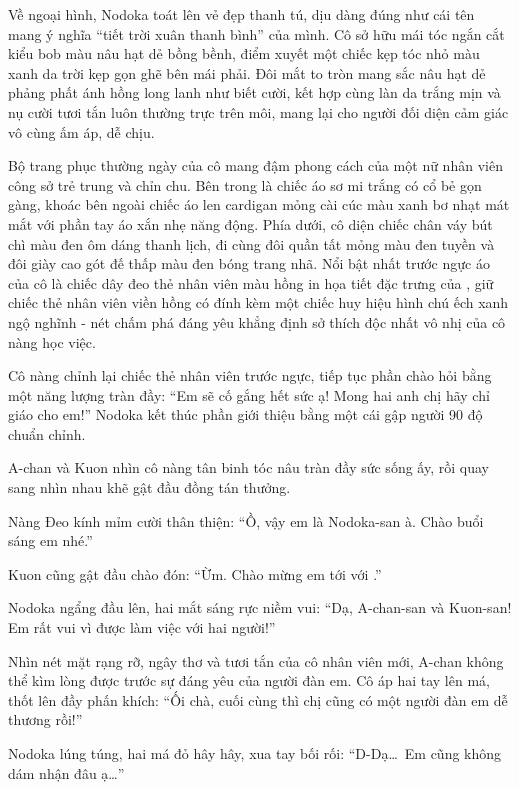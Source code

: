 \documentclass[../main.tex]{subfiles}
\begin{document}
Về ngoại hình, Nodoka toát lên vẻ đẹp thanh tú, dịu dàng đúng như cái tên mang ý nghĩa ``tiết trời xuân thanh bình'' của mình. Cô sở hữu mái tóc ngắn cắt kiểu bob màu nâu hạt dẻ bồng bềnh, điểm xuyết một chiếc kẹp tóc nhỏ màu xanh da trời kẹp gọn ghẽ bên mái phải. Đôi mắt to tròn mang sắc nâu hạt dẻ phảng phất ánh hồng long lanh như biết cười, kết hợp cùng làn da trắng mịn và nụ cười tươi tắn luôn thường trực trên môi, mang lại cho người đối diện cảm giác vô cùng ấm áp, dễ chịu.

Bộ trang phục thường ngày của cô mang đậm phong cách của một nữ nhân viên công sở trẻ trung và chỉn chu. Bên trong là chiếc áo sơ mi trắng có cổ bẻ gọn gàng, khoác bên ngoài chiếc áo len cardigan mỏng cài cúc màu xanh bơ nhạt mát mắt với phần tay áo xắn nhẹ năng động. Phía dưới, cô diện chiếc chân váy bút chì màu đen ôm dáng thanh lịch, đi cùng đôi quần tất mỏng màu đen tuyền và đôi giày cao gót đế thấp màu đen bóng trang nhã. Nổi bật nhất trước ngực áo của cô là chiếc dây đeo thẻ nhân viên màu hồng in họa tiết đặc trưng của \hll, giữ chiếc thẻ nhân viên viền hồng có đính kèm một chiếc huy hiệu hình chú ếch xanh ngộ nghĩnh - nét chấm phá đáng yêu khẳng định sở thích độc nhất vô nhị của cô nàng học việc.

\chrint

Cô nàng chỉnh lại chiếc thẻ nhân viên trước ngực, tiếp tục phần chào hỏi bằng một năng lượng tràn đầy: ``Em sẽ cố gắng hết sức ạ! Mong hai anh chị hãy chỉ giáo cho em!'' Nodoka kết thúc phần giới thiệu bằng một cái gập người 90 độ chuẩn chỉnh.

A-chan và Kuon nhìn cô nàng tân binh tóc nâu tràn đầy sức sống ấy, rồi quay sang nhìn nhau khẽ gật đầu đồng tán thưởng.

Nàng Đeo kính mỉm cười thân thiện: ``Ồ, vậy em là Nodoka-san à. Chào buổi sáng em nhé.''

Kuon cũng gật đầu chào đón: ``Ừm. Chào mừng em tới với \hll.''

Nodoka ngẩng đầu lên, hai mắt sáng rực niềm vui: ``Dạ, A-chan-san và Kuon-san! Em rất vui vì được làm việc với hai người!''

Nhìn nét mặt rạng rỡ, ngây thơ và tươi tắn của cô nhân viên mới, A-chan không thể kìm lòng được trước sự đáng yêu của người đàn em. Cô áp hai tay lên má, thốt lên đầy phấn khích: ``Ối chà, cuối cùng thì chị cũng có một người đàn em dễ thương rồi!''

Nodoka lúng túng, hai má đỏ hây hây, xua tay bối rối: ``D-Dạ\dots\ Em cũng không dám nhận đâu ạ\dots''
\end{document}
